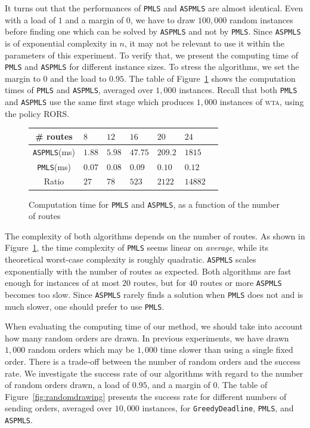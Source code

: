 \documentclass[a4paper,10pt]{journal}
\newcommand\greedydeadline{\texttt{GreedyDeadline}\xspace}
\newcommand\PMLS{\texttt{PMLS}\xspace}
\newcommand\ASPMLS{\texttt{ASPMLS}\xspace}
\newcommand\wta{\textsc{wta}\xspace}
\begin{document}
It turns out that the performances of \PMLS and \ASPMLS are almost identical. Even with a load of $1$ and a margin of $0$, we have to draw $100,000$ random instances before finding one which can be solved by \ASPMLS and not by \PMLS. Since \ASPMLS is of exponential complexity in $n$, it may not be relevant to use it within the parameters of this experiment. To verify that, we present the computing time of \PMLS and \ASPMLS for different instance sizes. To stress the algorithms, we set the margin to $0$ and the load to $0.95$. The table of Figure~\ref{fig:tps_fpt} shows the computation times of \PMLS and \ASPMLS, averaged over $1,000$ instances. Recall that both \PMLS and \ASPMLS use the same first stage which produces $1,000$ instances of \wta, using the policy RORS.
     
          \begin{figure}[h] 
       \begin{center}
   \begin{tabularx}{0.8\textwidth}{|c|X|X|X|X|X|X|}
    \hline
    \# routes& $8$ & $12$ & $16$& $20$ & $24$\\
    \hline
    \ASPMLS (ms) & $1.88$ &$5.98$&$47.75$&$209.2$&$1815$\\
    \hline
     \PMLS (ms) & $0.07$ &$0.08$&$0.09$&$0.10$&$0.12$\\
    \hline
    Ratio & $27$ &$78$&$523$&$2122$&$14882$\\
    \hline
      \end{tabularx}
      \end{center}
   \caption{Computation time for \PMLS and \ASPMLS, as a function of the number of routes}
        \label{fig:tps_fpt}
     \end{figure}
    



  The complexity of both algorithms depends on the number of routes. As shown in Figure~\ref{fig:tps_fpt}, the time complexity of \PMLS seems linear on \emph{average}, while its theoretical worst-case complexity is roughly quadratic. \ASPMLS scales exponentially with the number of routes as expected. Both algorithms are fast enough for instances of at most $20$ routes, but for $40$ routes or more \ASPMLS becomes too slow. Since \ASPMLS rarely finds a solution when \PMLS does not and is much slower, one should prefer to use \PMLS. 

    When evaluating the computing time of our method, we should take into account how many random orders are drawn. In previous experiments, we have drawn $1,000$ random orders which may be $1,000$ time slower than using a single fixed order. There is a trade-off between the number of random orders and the success rate. We investigate the success rate of our algorithms with regard to the number of random orders drawn, a load of $0.95$, and a margin of $0$. The table of Figure~\ref{fig:randomdrawing} presents the success rate for different numbers of sending orders, averaged over $10,000$ instances, for \greedydeadline, \PMLS, and \ASPMLS.
\end{document}
